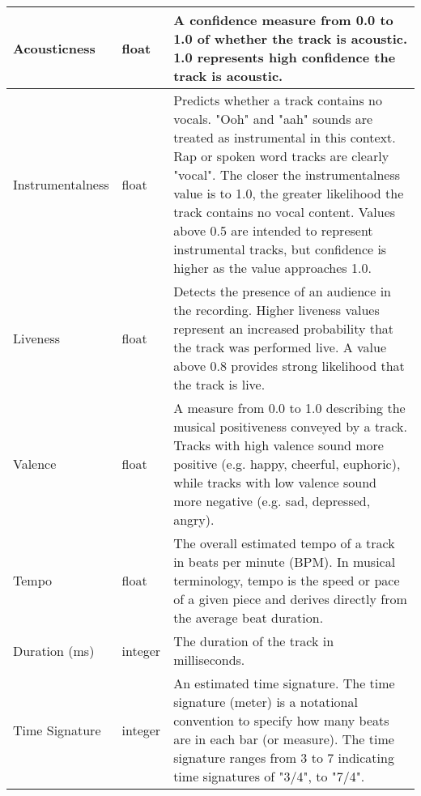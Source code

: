 \begin{table}[ht]
{\begin{tabular}{|>{\raggedright\arraybackslash}p{}|>{\raggedright\arraybackslash}p{}|>{\raggedright\arraybackslash}p{}|}
    \hline
    Acousticness & float & A confidence measure from 0.0 to 1.0 of whether the track is acoustic. 1.0 represents high confidence the track is acoustic. \\
    \hline
    Instrumentalness & float & Predicts whether a track contains no vocals. "Ooh" and "aah" sounds are treated as instrumental in this context. Rap or spoken word tracks are clearly "vocal". The closer the instrumentalness value is to 1.0, the greater likelihood the track contains no vocal content. Values above 0.5 are intended to represent instrumental tracks, but confidence is higher as the value approaches 1.0. \\
    \hline
    Liveness & float & Detects the presence of an audience in the recording. Higher liveness values represent an increased probability that the track was performed live. A value above 0.8 provides strong likelihood that the track is live. \\
    \hline
    Valence & float & A measure from 0.0 to 1.0 describing the musical positiveness conveyed by a track. Tracks with high valence sound more positive (e.g. happy, cheerful, euphoric), while tracks with low valence sound more negative (e.g. sad, depressed, angry). \\
    \hline
    Tempo & float & The overall estimated tempo of a track in beats per minute (BPM). In musical terminology, tempo is the speed or pace of a given piece and derives directly from the average beat duration. \\
    \hline
    Duration (ms) & integer & The duration of the track in milliseconds. \\
    \hline
    Time Signature & integer & An estimated time signature. The time signature (meter) is a notational convention to specify how many beats are in each bar (or measure). The time signature ranges from 3 to 7 indicating time signatures of "3/4", to "7/4". \\
    \hline
    \end{tabular}
    }
\end{table}